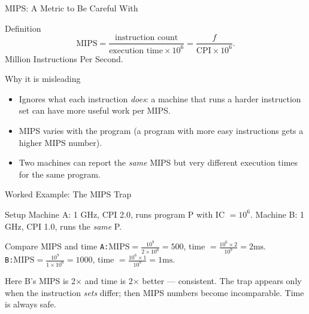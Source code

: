 \documentclass[aspectratio=169]{beamer}
\begin{document}
\begin{frame}{MIPS: A Metric to Be Careful With}
  \begin{block}{Definition}
    \[
      \text{MIPS} = \frac{\text{instruction count}}{\text{execution time}
      \times 10^6} = \frac{f}{\text{CPI} \times 10^6}.
    \]
    Million Instructions Per Second.
  \end{block}
  \begin{alertblock}{Why it is misleading}
    \begin{itemize}
      \item Ignores what each instruction \emph{does}: a machine that runs a
        harder instruction set can have more useful work per MIPS.
      \item MIPS varies with the program (a program with more easy
        instructions gets a higher MIPS number).
      \item Two machines can report the \emph{same} MIPS but very different
        execution times for the same program.
    \end{itemize}
  \end{alertblock}
  \vspace{0.2cm}
  \cite{PattersonHennessy2017_computer_organization_design}
\end{frame}

\begin{frame}{Worked Example: The MIPS Trap}
  \begin{block}{Setup}
    Machine A: 1 GHz, CPI 2.0, runs program P with IC $= 10^6$. Machine B:
    1 GHz, CPI 1.0, runs the \emph{same} P.
  \end{block}
  \begin{exampleblock}{Compare MIPS and time}
    \texttt{A:}\quad $\text{MIPS} = \tfrac{10^9}{2\times 10^6} = 500$, time $=
    \tfrac{10^6 \times 2}{10^9} = 2\text{ms}$.\\
    \texttt{B:}\quad $\text{MIPS} = \tfrac{10^9}{1\times 10^6} = 1000$, time $=
    \tfrac{10^6 \times 1}{10^9} = 1\text{ms}$.
  \end{exampleblock}
  \vspace{0.2cm}
  Here B's MIPS is 2$\times$ and time is 2$\times$ better --- consistent. The
  trap appears only when the instruction \emph{sets} differ; then MIPS numbers
  become incomparable. Time is always safe.
\end{frame}
\end{document}
